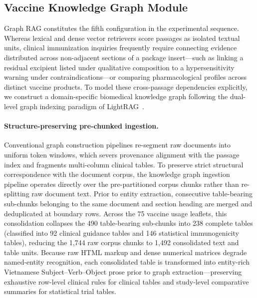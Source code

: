 \documentclass[sn-mathphys, oneside]{sn-jnl}
\begin{document}
\subsection{Vaccine Knowledge Graph Module}
\label{subsec:kg_module}
Graph RAG constitutes the fifth configuration in the experimental sequence. Whereas lexical and dense vector retrievers score passages as isolated textual units, clinical immunization inquiries frequently require connecting evidence distributed across non-adjacent sections of a package insert—such as linking a residual excipient listed under qualitative composition to a hypersensitivity warning under contraindications—or comparing pharmacological profiles across distinct vaccine products. To model these cross-passage dependencies explicitly, we construct a domain-specific biomedical knowledge graph following the dual-level graph indexing paradigm of LightRAG~\cite{guo2024lightrag}.

\paragraph{Structure-preserving pre-chunked ingestion.}
Conventional graph construction pipelines re-segment raw documents into uniform token windows, which severs provenance alignment with the passage index and fragments multi-column clinical tables. To preserve strict structural correspondence with the document corpus, the knowledge graph ingestion pipeline operates directly over the pre-partitioned corpus chunks rather than re-splitting raw document text. Prior to entity extraction, consecutive table-bearing sub-chunks belonging to the same document and section heading are merged and deduplicated at boundary rows. Across the 75 vaccine usage leaflets, this consolidation collapses the 490 table-bearing sub-chunks into 238 complete tables (classified into 92 clinical guidance tables and 146 statistical immunogenicity tables), reducing the 1,744 raw corpus chunks to 1,492 consolidated text and table units. Because raw HTML markup and dense numerical matrices degrade named-entity recognition, each consolidated table is transformed into entity-rich Vietnamese Subject--Verb--Object prose prior to graph extraction—preserving exhaustive row-level clinical rules for clinical tables and study-level comparative summaries for statistical trial tables.
\end{document}
